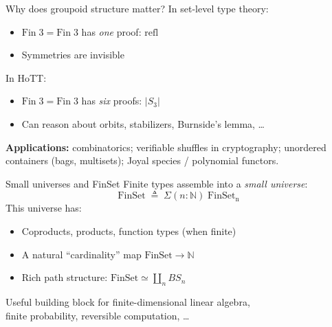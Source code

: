 \documentclass[aspectratio=169,12pt]{beamer}
\newcommand{\refl}{\mathrm{refl}}
\newcommand{\Fin}{\mathrm{Fin}}
\begin{document}
\begin{frame}{Why does groupoid structure matter?}
  In set-level type theory:
  \begin{itemize}
    \item $\Fin\;3 = \Fin\;3$ has \emph{one} proof: $\refl$
    \item Symmetries are invisible
  \end{itemize}
  \pause\medskip
  In HoTT:
  \begin{itemize}
    \item $\Fin\;3 = \Fin\;3$ has \emph{six} proofs: $|S_3|$
    \item Can reason about orbits, stabilizers, Burnside's lemma, \ldots
  \end{itemize}
  \pause\medskip
  \textbf{Applications:} combinatorics;
  verifiable shuffles in cryptography;
  unordered containers (bags, multisets);
  Joyal species / polynomial functors.
\end{frame}

\begin{frame}{Small universes and FinSet}
  Finite types assemble into a \emph{small universe}:
  \[
    \mathrm{FinSet} \;\triangleq\;
    \Sigma(n : \mathbb{N})\; \mathrm{FinSet_n}
  \]
  \pause\medskip
  This universe has:
  \begin{itemize}
    \item Coproducts, products, function types (when finite)
    \item A natural ``cardinality'' map $\mathrm{FinSet} \to \mathbb{N}$
    \item Rich path structure: $\mathrm{FinSet} \simeq \coprod_n B S_n$
  \end{itemize}
  \pause\medskip

  \pause\medskip
  Useful building block for finite-dimensional linear algebra, \\
  finite probability, reversible computation, \ldots
\end{frame}
\end{document}
